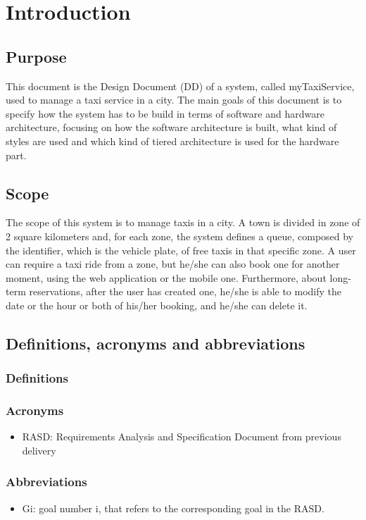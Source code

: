 \section{Introduction}
\subsection{Purpose}
	This document is the Design Document (DD) of a system, called myTaxiService, used to manage  a taxi service in a city. The main goals of this document is to specify how the system has to be build in terms of software and hardware architecture, focusing on how the software architecture is built, what kind of styles are used and which kind of tiered architecture is used for the hardware part.
\subsection{Scope}
	The scope of this system is to manage taxis in a city. A town is divided in zone of 2 square kilometers and, for each zone, the system defines a queue, composed by the identifier, which is the vehicle plate, of free taxis in that specific zone. A user can require a taxi ride from a zone, but he/she can also book one for another moment, using the web application or the mobile one. Furthermore, about long-term reservations, after the user has created one, he/she is able to modify the date or the hour or both of his/her booking, and he/she can delete it. 
\subsection{Definitions, acronyms and abbreviations}
	\subsubsection{Definitions}
	\subsubsection{Acronyms}
		 \begin{itemize}
		 	\item RASD: Requirements Analysis and Specification Document from previous delivery
		 \end{itemize}
	\subsubsection{Abbreviations}
		\begin{itemize}
			\item Gi: goal number i, that refers to the corresponding goal in the RASD.
		\end{itemize}
